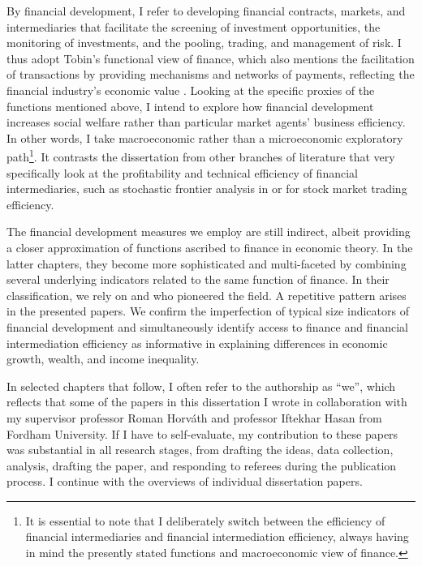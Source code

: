 \begin{refsection}
By financial development, I refer to developing financial contracts, markets, and intermediaries that facilitate the screening of investment opportunities, the monitoring of investments, and the pooling, trading, and management of risk. I thus adopt Tobin's functional view of finance, which also mentions the facilitation of transactions by providing mechanisms and networks of payments, reflecting the financial industry's economic value \parencite{Tobin1984}. Looking at the specific proxies of the functions mentioned above, I intend to explore how financial development increases social welfare rather than particular market agents' business efficiency. In other words, I take macroeconomic rather than a microeconomic exploratory path\footnote{It is essential to note that I deliberately switch between the efficiency of financial intermediaries and financial intermediation efficiency, always having in mind the presently stated functions and macroeconomic view of finance.}.  It contrasts the dissertation from other branches of literature that very specifically look at the profitability and technical efficiency of financial intermediaries, such as stochastic frontier analysis in \textcite{bonin2005privatization} or \textcite{cici2018trading} for stock market trading efficiency.

The financial development measures we employ are still indirect, albeit providing a closer approximation of functions ascribed to finance in economic theory.  In the latter chapters, they become more sophisticated and multi-faceted by combining several underlying indicators related to the same function of finance. In their classification, we rely on \textcite{Cihaketal2013} and \textcite{svirydzenka2016introducing} who pioneered the field. A repetitive pattern arises in the presented papers. We confirm the imperfection of typical size indicators of financial development and simultaneously identify access to finance and financial intermediation efficiency as informative in explaining differences in economic growth, wealth, and income inequality.

In selected chapters that follow, I often refer to the authorship as ``we'', which reflects that some of the papers in this dissertation I wrote in collaboration with my supervisor professor Roman Horv\'{a}th and professor Iftekhar Hasan from Fordham University. If I have to self-evaluate, my contribution to these papers was substantial in all research stages, from drafting the ideas, data collection, analysis, drafting the paper, and responding to referees during the publication process. I continue with the overviews of individual dissertation papers.


\end{refsection}
